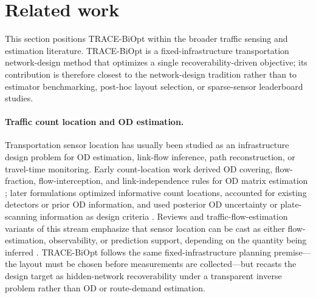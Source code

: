 \section{Related work}
\label{sec:related}

This section positions TRACE-BiOpt within the broader traffic sensing and
estimation literature.  TRACE-BiOpt is a fixed-infrastructure transportation
network-design method that optimizes a single recoverability-driven objective;
its contribution is therefore closest to the network-design tradition rather
than to estimator benchmarking, post-hoc layout selection, or sparse-sensor
leaderboard studies.

\paragraph{Traffic count location and OD estimation.}
Transportation sensor location has usually been studied as an infrastructure
design problem for OD estimation, link-flow inference, path reconstruction, or
travel-time monitoring.  Early count-location work derived OD covering,
flow-fraction, flow-interception, and link-independence rules for OD matrix
estimation \citep{yang1998optimal}; later formulations optimized informative
count locations, accounted for existing detectors or prior OD information, and
used posterior OD uncertainty or plate-scanning information as design criteria
\citep{ehlert2006optimisation,castillo2008trip,minguez2010plate,simonelli2012od}.
Reviews and traffic-flow-estimation variants of this stream emphasize that
sensor location can be cast as either flow-estimation, observability, or
prediction support, depending on the quantity being inferred
\citep{gentili2011survey,zhu2014estimation}.  TRACE-BiOpt follows the same
fixed-infrastructure planning premise---the layout must be chosen before
measurements are collected---but recasts the design target as hidden-network
recoverability under a transparent inverse problem rather than OD or
route-demand estimation.

